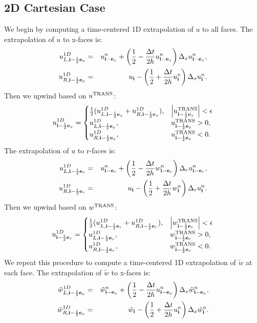 \documentclass[11pt]{article}
\def\half  {\frac{1}{2}}
\def\dt    {\Delta t}
\def\trans {\rm TRANS}
\def\eb    {{\bf e}}
\def\ib    {{\bf i}}
\def\wt    {\tilde{w}}
\begin{document}
\subsection{2D Cartesian Case}
We begin by computing a time-centered 1D extrapolation of $u$ to all faces.  The extrapolation of $u$ to x-faces is:
\begin{eqnarray}
u_{L,\ib-\half\eb_x}^{1D} &=& u_{\ib-\eb_x}^n + \left(\half - \frac{\dt}{2h}u_{\ib-\eb_x}^n\right)\Delta_x u_{\ib-\eb_x}^n, \\
u_{R,\ib-\half\eb_x}^{1D} &=& u_{\ib} - \left(\half + \frac{\dt}{2h}u_{\ib}^n\right)\Delta_x u_{\ib}^n.
\end{eqnarray}
Then we upwind based on $u^{\trans}$:
\begin{equation}
u_{\ib-\half\eb_x}^{1D} =
\begin{cases}
\half(u_{L,\ib-\half\eb_x}^{1D} + u_{R,\ib-\half\eb_x}^{1D}), & \left|u^{\trans}_{\ib-\half\eb_x}\right| < \epsilon \\
u_{L,\ib-\half\eb_x}^{1D}, & u^{\trans}_{\ib-\half\eb_x} > 0, \\
u_{R,\ib-\half\eb_x}^{1D}, & u^{\trans}_{\ib-\half\eb_x} < 0. \\
\end{cases}
\end{equation}
The extrapolation of $u$ to r-faces is:
\begin{eqnarray}
u_{L,\ib-\half\eb_r}^{1D} &=& u_{\ib-\eb_r}^n + \left(\half - \frac{\dt}{2h}w_{\ib-\eb_r}^n\right)\Delta_r u_{\ib-\eb_r}^n, \\
u_{R,\ib-\half\eb_r}^{1D} &=& u_{\ib} - \left(\half + \frac{\dt}{2h}w_{\ib}^n\right)\Delta_r u_{\ib}^n.
\end{eqnarray}
Then we upwind based on $w^{\trans}$:
\begin{equation}
u_{\ib-\half\eb_r}^{1D} =
\begin{cases}
\half(u_{L,\ib-\half\eb_r}^{1D} + u_{R,\ib-\half\eb_r}^{1D}), & \left|w^{\trans}_{\ib-\half\eb_r}\right| < \epsilon \\
u_{L,\ib-\half\eb_r}^{1D}, & w^{\trans}_{\ib-\half\eb_r} > 0, \\
u_{R,\ib-\half\eb_r}^{1D}, & w^{\trans}_{\ib-\half\eb_r} < 0. \\
\end{cases}
\end{equation}
We repeat this procedure to compute a time-centered 1D extrapolation of $\wt$ at each face.  The extrapolation of $\wt$ to x-faces is:
\begin{eqnarray}
\wt_{L,\ib-\half\eb_x}^{1D} &=& \wt_{\ib-\eb_x}^n + \left(\half - \frac{\dt}{2h}u_{\ib-\eb_x}^n\right)\Delta_x \wt_{\ib-\eb_x}^n, \\
\wt_{R,\ib-\half\eb_x}^{1D} &=& \wt_{\ib} - \left(\half + \frac{\dt}{2h}u_{\ib}^n\right)\Delta_x \wt_{\ib}^n.
\end{eqnarray}
\end{document}
